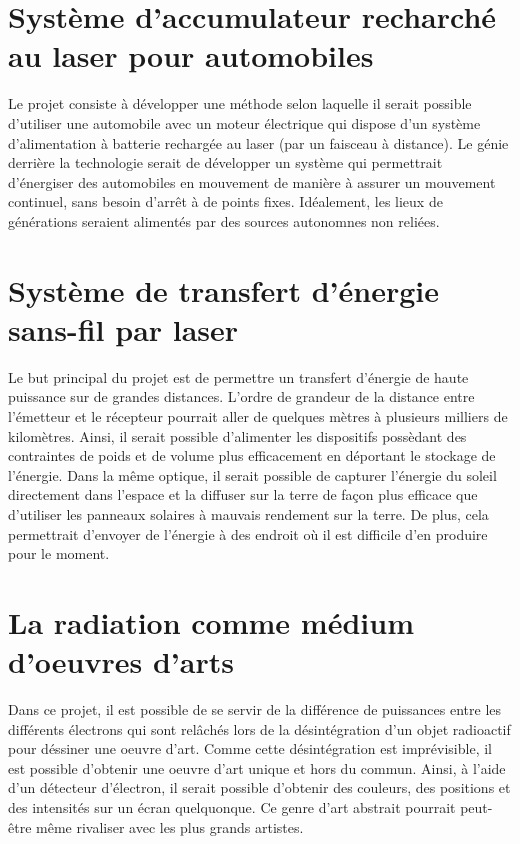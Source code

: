 \section{Système d'accumulateur recharché au laser pour automobiles}
Le projet consiste à développer une méthode selon laquelle il serait possible d'utiliser une automobile avec un moteur électrique qui dispose d'un système d'alimentation à batterie rechargée au laser (par un faisceau à distance). Le génie derrière la technologie serait de développer un système qui permettrait d'énergiser des automobiles en mouvement de manière à assurer un mouvement continuel, sans besoin d'arrêt à de points fixes. Idéalement, les lieux de générations seraient alimentés par des sources autonomnes non reliées. 

\section{Système de transfert d'énergie sans-fil par laser}
Le but principal du projet est de permettre un transfert d'énergie de haute puissance sur de grandes distances. L'ordre de grandeur de la distance entre l'émetteur et le récepteur pourrait aller de quelques mètres à plusieurs milliers de kilomètres. Ainsi, il serait possible d'alimenter les dispositifs possèdant des contraintes de poids et de volume plus efficacement en déportant le stockage de l'énergie. Dans la même optique, il serait possible de capturer l'énergie du soleil directement dans l'espace et la diffuser sur la terre de façon plus efficace que d'utiliser les panneaux solaires à mauvais rendement sur la terre. De plus, cela permettrait d'envoyer de l'énergie à des endroit où il est difficile d'en produire pour le moment.

\section{La radiation comme médium d'oeuvres d'arts}
Dans ce projet, il est possible de se servir de la différence de puissances entre les différents électrons qui sont relâchés lors de la désintégration d'un objet radioactif pour déssiner une oeuvre d'art. Comme cette désintégration est imprévisible, il est possible d'obtenir une oeuvre d'art unique et hors du commun. Ainsi, à l'aide d'un détecteur d'électron, il serait possible d'obtenir des couleurs, des positions et des intensités sur un écran quelquonque. Ce genre d'art abstrait pourrait peut-être même rivaliser avec les plus grands artistes.